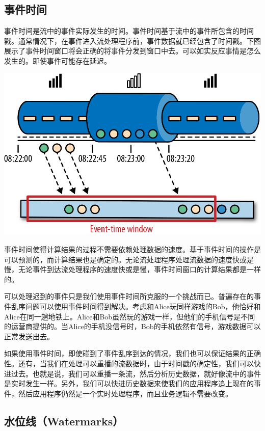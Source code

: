 \documentclass[oneside]{ctexbook}
\begin{document}
\subsection{事件时间}

事件时间是流中的事件实际发生的时间。事件时间基于流中的事件所包含的时间戳。通常情况下，在事件进入流处理程序前，事件数据就已经包含了时间戳。下图展示了事件时间窗口将会正确的将事件分发到窗口中去。可以如实反应事情是怎么发生的。即使事件可能存在延迟。

\noindent\includegraphics[width=\textwidth]{spaf_0213.png}

事件时间使得计算结果的过程不需要依赖处理数据的速度。基于事件时间的操作是可以预测的，而计算结果也是确定的。无论流处理程序处理流数据的速度快或是慢，无论事件到达流处理程序的速度快或是慢，事件时间窗口的计算结果都是一样的。

可以处理迟到的事件只是我们使用事件时间所克服的一个挑战而已。普遍存在的事件乱序问题可以使用事件时间得到解决。考虑和Alice玩同样游戏的Bob，他恰好和Alice在同一趟地铁上。Alice和Bob虽然玩的游戏一样，但他们的手机信号是不同的运营商提供的。当Alice的手机没信号时，Bob的手机依然有信号，游戏数据可以正常发送出去。

如果使用事件时间，即使碰到了事件乱序到达的情况，我们也可以保证结果的正确性。还有，当我们在处理可以重播的流数据时，由于时间戳的确定性，我们可以快进过去。也就是说，我们可以重播一条流，然后分析历史数据，就好像流中的事件是实时发生一样。另外，我们可以快进历史数据来使我们的应用程序追上现在的事件，然后应用程序仍然是一个实时处理程序，而且业务逻辑不需要改变。

\subsection{水位线（Watermarks）}
\end{document}
